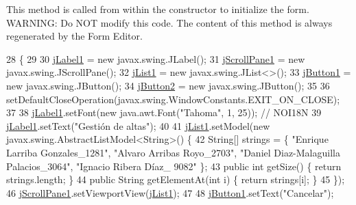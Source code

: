 This method is called from within the constructor to initialize the form. W\+A\+R\+N\+I\+NG\+: Do N\+OT modify this code. The content of this method is always regenerated by the Form Editor. 
\begin{DoxyCode}
28                                   \{
29 
30         \mbox{\hyperlink{classsoftware_1_1_gestiondealtas_a0ef50908d3fbffb4f2704062e57ee873}{jLabel1}} = \textcolor{keyword}{new} javax.swing.JLabel();
31         \mbox{\hyperlink{classsoftware_1_1_gestiondealtas_aaae4daa1d692c7fbf9d53666e54cee13}{jScrollPane1}} = \textcolor{keyword}{new} javax.swing.JScrollPane();
32         \mbox{\hyperlink{classsoftware_1_1_gestiondealtas_ac1e9b172368b6ae85174bceb13935256}{jList1}} = \textcolor{keyword}{new} javax.swing.JList<>();
33         \mbox{\hyperlink{classsoftware_1_1_gestiondealtas_ae72c1863bf05ff8d6bf46ebbba12a891}{jButton1}} = \textcolor{keyword}{new} javax.swing.JButton();
34         \mbox{\hyperlink{classsoftware_1_1_gestiondealtas_ac9d4185d1fb15805001c5adb3dd68576}{jButton2}} = \textcolor{keyword}{new} javax.swing.JButton();
35 
36         setDefaultCloseOperation(javax.swing.WindowConstants.EXIT\_ON\_CLOSE);
37 
38         \mbox{\hyperlink{classsoftware_1_1_gestiondealtas_a0ef50908d3fbffb4f2704062e57ee873}{jLabel1}}.setFont(\textcolor{keyword}{new} java.awt.Font(\textcolor{stringliteral}{"Tahoma"}, 1, 25)); \textcolor{comment}{// NOI18N}
39         \mbox{\hyperlink{classsoftware_1_1_gestiondealtas_a0ef50908d3fbffb4f2704062e57ee873}{jLabel1}}.setText(\textcolor{stringliteral}{"Gestión de altas"});
40 
41         \mbox{\hyperlink{classsoftware_1_1_gestiondealtas_ac1e9b172368b6ae85174bceb13935256}{jList1}}.setModel(\textcolor{keyword}{new} javax.swing.AbstractListModel<String>() \{
42             String[] strings = \{ \textcolor{stringliteral}{"Enrique Larriba Gonzales\_1281"}, \textcolor{stringliteral}{"Alvaro Arribas Royo\_2703"}, \textcolor{stringliteral}{"Daniel
       Diaz-Malaguilla Palacios\_3064"}, \textcolor{stringliteral}{"Ignacio Ribera Díaz\_ 9082"} \};
43             \textcolor{keyword}{public} \textcolor{keywordtype}{int} getSize() \{ \textcolor{keywordflow}{return} strings.length; \}
44             \textcolor{keyword}{public} String getElementAt(\textcolor{keywordtype}{int} i) \{ \textcolor{keywordflow}{return} strings[i]; \}
45         \});
46         \mbox{\hyperlink{classsoftware_1_1_gestiondealtas_aaae4daa1d692c7fbf9d53666e54cee13}{jScrollPane1}}.setViewportView(\mbox{\hyperlink{classsoftware_1_1_gestiondealtas_ac1e9b172368b6ae85174bceb13935256}{jList1}});
47 
48         \mbox{\hyperlink{classsoftware_1_1_gestiondealtas_ae72c1863bf05ff8d6bf46ebbba12a891}{jButton1}}.setText(\textcolor{stringliteral}{"Cancelar"});

\end{DoxyCode}
